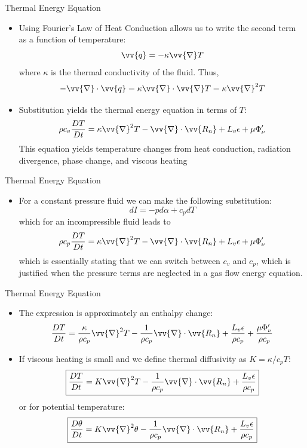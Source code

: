 \begin{frame}{Thermal Energy Equation}

\begin{itemize}
	\item Using Fourier's Law of Heat Conduction allows us to write the second term as a function of temperature:
	$$\vv{q} = -\kappa \vv{\nabla}T$$
	where $\kappa$ is the thermal conductivity of the fluid. Thus,
	$$-\vv{\nabla}\cdot \vv{q} = \kappa \vv{\nabla} \cdot \vv{\nabla}T = \kappa \vv{\nabla}^2 T$$
	\item Substitution yields the thermal energy equation in terms of $T$:
	$$\rho c_v \frac{DT}{Dt} = \kappa \vv{\nabla}^2 T -\vv{\nabla}\cdot \vv{R_n} + L_v\epsilon + \mu \Phi^\prime_\nu$$
	This equation yields temperature changes from heat conduction, radiation divergence, phase change, and viscous heating

\end{itemize}
\end{frame}
\begin{frame}{Thermal Energy Equation}

\begin{itemize}
	\item For a constant pressure fluid we can make the following substitution:
	$$dI = -pd\alpha + c_pdT$$
	which for an incompressible fluid leads to
	$$\rho c_p \frac{DT}{Dt} = \kappa \vv{\nabla}^2 T -\vv{\nabla}\cdot \vv{R_n} + L_v\epsilon + \mu \Phi^\prime_\nu$$
	which is essentially stating that we can switch between $c_v$ and $c_p$, which is justified when the pressure terms are neglected in a gas flow energy equation.
\end{itemize}
\end{frame}
\begin{frame}{Thermal Energy Equation}

\begin{itemize}
	\item The expression is approximately an enthalpy change:
	$$\frac{DT}{Dt} = \frac{\kappa}{\rho c_p} \vv{\nabla}^2 T -\frac{1}{\rho c_p}\vv{\nabla}\cdot \vv{R_n} + \frac{L_v\epsilon}{\rho c_p} + \frac{\mu \Phi^\prime_\nu}{\rho c_p}$$
	\item If viscous heating is small and we define thermal diffusivity as $K=\kappa/c_pT$:
	$$\boxed{\frac{DT}{Dt} = K\vv{\nabla}^2 T -\frac{1}{\rho c_p}\vv{\nabla}\cdot \vv{R_n} + \frac{L_v\epsilon}{\rho c_p}}$$
	or for potential temperature:
	$$\boxed{\frac{D\theta}{Dt} = K\vv{\nabla}^2 \theta -\frac{1}{\rho c_p}\vv{\nabla}\cdot \vv{R_n} + \frac{L_v\epsilon}{\rho c_p}}$$
\end{itemize}
\end{frame}
